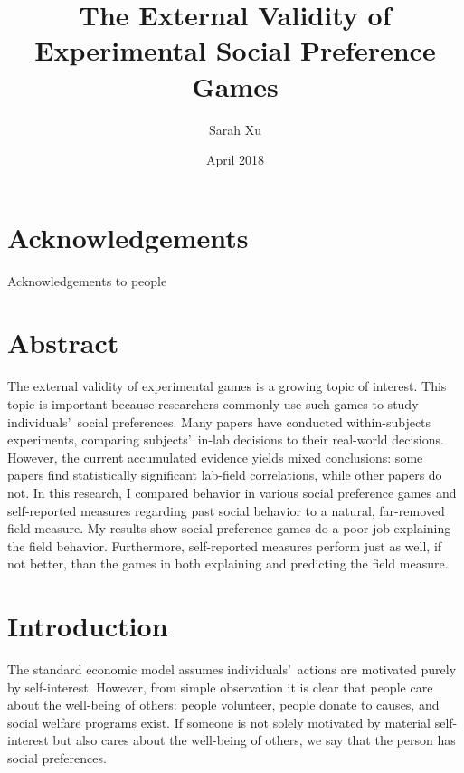 \documentclass[12pt]{article}
\title{The External Validity of Experimental Social Preference Games}
\author{Sarah Xu}
\date{April 2018}
\begin{document}
\maketitle
\newpage
\singlespacing
\tableofcontents


\newpage


\section*{Acknowledgements}
Acknowledgements to people


\newpage

\section*{Abstract}

\doublespacing
The external validity of experimental games is a growing topic of interest. This topic is important because researchers commonly use such games to study individuals\rq \ social preferences. Many papers have conducted within-subjects experiments, comparing subjects\rq \ in-lab decisions to their real-world decisions. However, the current accumulated evidence yields mixed conclusions: some papers find statistically significant lab-field correlations, while other papers do not. In this research, I compared behavior in various social preference games and self-reported measures regarding past social behavior to a natural, far-removed field measure. My results show social preference games do a poor job explaining the field behavior. Furthermore, self-reported measures perform just as well, if not better, than the games in both explaining and predicting the field measure.



\newpage


\doublespacing
\section{Introduction}

The standard economic model assumes individuals\rq \ actions are motivated purely by self-interest. However, from simple observation it is clear that people care about the well-being of others: people volunteer, people donate to causes, and social welfare programs exist. If someone is not solely motivated by material self-interest but also cares about the well-being of others, we say that the person has social preferences. 
\end{document}
